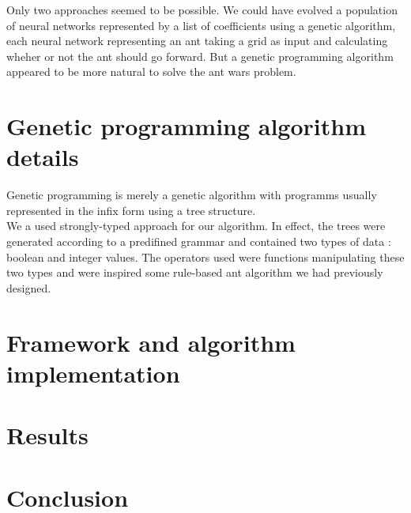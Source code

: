 \documentclass[10pt,a4paper]{article}
\begin{document}
Only two approaches seemed to be possible. We could have evolved a
population of neural networks represented by a list of coefficients
using a genetic algorithm, each neural network representing an ant
taking a grid as input and calculating wheher or not the ant should go
forward. But a genetic programming algorithm appeared to be more
natural to solve the ant wars problem.

\section{Genetic programming algorithm details}

Genetic programming is merely a genetic algorithm with programms
usually represented in the infix form using a tree structure.\\

We a used strongly-typed approach for our algorithm. In effect, the
trees were generated according to a predifined grammar and contained
two types of data : boolean and integer values. The operators used
were functions manipulating these two types and were inspired some
rule-based ant algorithm we had previously designed.\\





\section{Framework and algorithm implementation}

\section{Results}

\section*{Conclusion}
\end{document}

